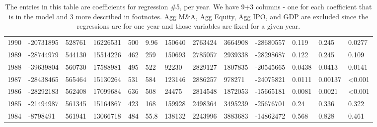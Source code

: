 \documentclass{article}
\begin{document}
\begin{table}[H]
\begin{tabular}{rllllllllllll}
  1990 & -20731895 & 528761 & 16226531 & 500 & 9.96 & 150640 & 2763424 & 3664908 & -28680557 & 0.119 & 0.245 & 0.0277 \\ 
  1989 & -28744979 & 544130 & 15514226 & 462 & 259 & 150693 & 2785057 & 2939338 & -28298687 & 0.122 & 0.245 & 0.109 \\ 
  1988 & -39639804 & 560730 & 17588981 & 495 & 522 & 92230 & 2829127 & 1807835 & -20545665 & 0.0438 & 0.0413 & 0.0141 \\ 
  1987 & -28438465 & 565464 & 15130264 & 531 & 584 & 123146 & 2886257 & 978271 & -24075821 & 0.0111 & 0.00137 & \textless 0.001 \\ 
  1986 & -28292183 & 562408 & 17099684 & 636 & 508 & 24475 & 2814548 & 1872053 & -15665181 & 0.0081 & 0.0021 & \textless 0.001 \\ 
  1985 & -21494987 & 561345 & 15164867 & 423 & 168 & 159928 & 2498364 & 3495239 & -25676701 & 0.24 & 0.336 & 0.322 \\ 
  1984 & -8798491 & 561941 & 13066718 & 484 & 55.8 & 138132 & 2243996 & 3883683 & -14862472 & 0.568 & 0.828 & 0.461 \\ 
   \hline
\end{tabular}
\caption{The entries in this table are coefficients for regression \#5, per year. 
                  We have 9+3 columns - one for each coefficient that is in the model and 3 more described in footnotes.
                  Agg M\&A, Agg Equity, Agg IPO, and GDP are excluded since the regressions are for one year and those 
                  variables are fixed for a given year.} 
\end{table}
\end{document}
